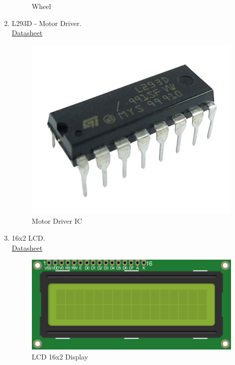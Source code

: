 \documentclass[a4paper,12pt,oneside]{book}
\begin{document}
\begin{enumerate}
\begin{figure}[h]
        \caption{Wheel}
      \end{figure}
    \item L293D - Motor Driver.\\
    \href{http://www.engineersgarage.com/sites/default/files/L293D.pdf}{ Datasheet}\par
   \begin{figure}[!ht]
        \centering
        \includegraphics[scale=0.2]{l293d}
        \caption{Motor Driver IC}
      \end{figure}
    \item 16x2 LCD.\\
    \href{http://www.engineersgarage.com/sites/default/files/LCD\%2016x2.pdf}{ Datasheet}\par
   \begin{figure}[!ht]
        \centering
        \includegraphics[scale=0.85]{lcd}
        \caption{LCD 16x2 Display}
      \end{figure}
      \newpage

\end{enumerate}
\end{document}
